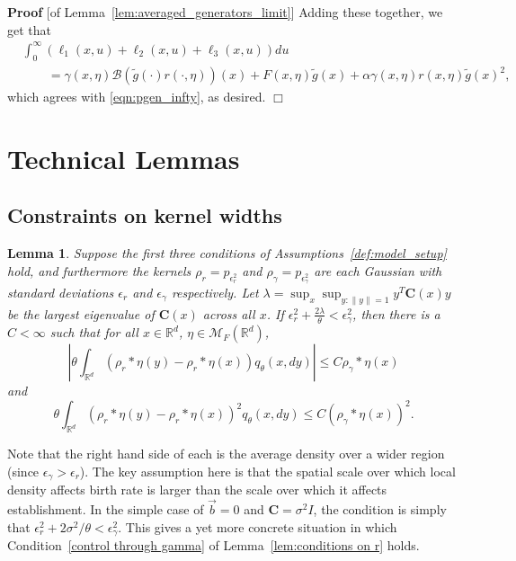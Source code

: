 \documentclass[12pt]{article}
\newenvironment {proof}{{\noindent\bf Proof }}{\hfill $\Box$ \medskip}
\newtheorem{lemma}[theorem]{Lemma}
\newcommand{\IR}{\mathbb R}
\newcommand{\DG}{\mathcal{B}}  %
\newcommand{\meanq}{\vec b}    %
\newcommand{\covq}{\mathbf{C}}     %
\newcommand{\kernel}{\rho}  %
\newcommand{\smooth}[1]{\kernel_{#1} \! * \!}  %
\newcommand{\measures}{\mathcal{M}_F(\IR^d)} %
\numberwithin{equation}{section}
\begin{document}
\begin{proof}[of Lemma~\ref{lem:averaged_generators_limit}]
Adding these together, we get that
\begin{align*}
    &
    \int_0^\infty (\ell_1(x,u) + \ell_2(x,u) + \ell_3(x,u)) du
    \\ &\qquad=
    \gamma(x,\eta) \DG(\widetilde{g}(\cdot)r(\cdot,\eta))(x)
    + F(x,\eta) \widetilde{g}(x) 
    + \alpha \gamma(x,\eta) r(x,\eta) \widetilde{g}(x)^2 ,
\end{align*}
which agrees with \eqref{eqn:pgen_infty}, as desired.
\end{proof}


\section{Technical Lemmas}

\subsection{Constraints on kernel widths}

\begin{lemma}
    \label{lem:gamma_bound}
    Suppose the first three conditions of Assumptions~\ref{def:model_setup} hold,
    and furthermore the kernels $\rho_r = p_{\epsilon_r^2}$ and $\rho_\gamma = p_{\epsilon_\gamma^2}$
    are each Gaussian with standard deviations $\epsilon_r$ and $\epsilon_\gamma$ respectively.
    Let $\lambda = \sup_x \sup_{y : \|y\| = 1} y^T \covq(x) y$ be the largest eigenvalue of $\covq(x)$
    across all $x$.
    If $\epsilon_{r}^2 + \frac{2\lambda}{\theta} < \epsilon_{\gamma}^2$, then 
    there is a $C < \infty$ such that
    for all $x\in\IR^d$, $\eta\in\measures$,
    \begin{equation}
        \label{eqn:first_moment_rho}
        \left|\theta \int_{\IR^d}
            ( \smooth{r} \eta(y)-\smooth{r} \eta(x) )
        q_\theta(x,dy)\right|
        \leq C \smooth{\gamma} \eta(x)
    \end{equation}
    and
    \begin{equation}
        \label{eqn:second_moment_rho}
        \theta \int_{\IR^d}
                \left( \smooth{r} \eta(y) - \smooth{r} \eta(x) \right)^2
        q_\theta(x,dy)
        \leq C \left(\smooth{\gamma}\eta(x) \right)^2 .
    \end{equation}
\end{lemma}

Note that the right hand side of each is the average density
over a wider region (since $\epsilon_\gamma > \epsilon_r$).
The key assumption here 
is that the spatial scale over which local density affects birth rate
is larger than the scale over which it affects establishment.
In the simple case of $\meanq = 0$ and $\covq = \sigma^2 I$,
the condition is simply that $\epsilon_r^2 + 2\sigma^2 / \theta < \epsilon_\gamma^2$.
This gives a yet more concrete situation in which 
Condition~\ref{control through gamma} of Lemma~\ref{lem:conditions on r} holds.
\end{document}
